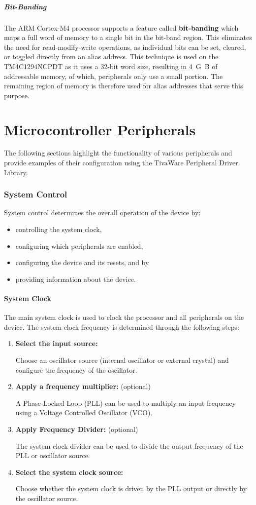 \documentclass{article}
\begin{document}
\subsubsection{Bit-Banding}
The ARM Cortex-M4 processor supports a feature called
\textbf{bit-banding} which maps a full word of memory to a single bit
in the bit-band region. This eliminates the need for read-modify-write
operations, as individual bits can be set, cleared, or toggled directly
from an alias address. This technique is used on the TM4C1294NCPDT as
it uses a 32-bit word size, resulting in \qty{4}{G.B} of addressable
memory, of which, peripherals only use a small portion. The remaining
region of memory is therefore used for alias addresses that serve this
purpose.
\part{Microcontroller Peripherals}
The following sections highlight the functionality of various
peripherals and provide examples of their configuration using the
TivaWare Peripheral Driver Library.
\section{System Control}
System control determines the overall operation of the device by:
\begin{itemize}
    \item controlling the system clock,
    \item configuring which peripherals are enabled,
    \item configuring the device and its resets, and by
    \item providing information about the device.
\end{itemize}
\subsection{System Clock}
The main system clock is used to clock the processor and all
peripherals on the device. The system clock frequency is determined
through the following steps:
\begin{enumerate}
    \item \textbf{Select the input source:}

          Choose an oscillator source (internal oscillator or external
          crystal) and configure the frequency of the oscillator.
    \item \textbf{Apply a frequency multiplier:} (optional)

          A Phase-Locked Loop (PLL) can be used to multiply an input
          frequency using a Voltage Controlled Oscillator (VCO).
    \item \textbf{Apply Frequency Divider:} (optional)

          The system clock divider can be used to divide the output
          frequency of the PLL or oscillator source.
    \item \textbf{Select the system clock source:}

          Choose whether the system clock is driven by the PLL output
          or directly by the oscillator source.
\end{enumerate}
\end{document}
